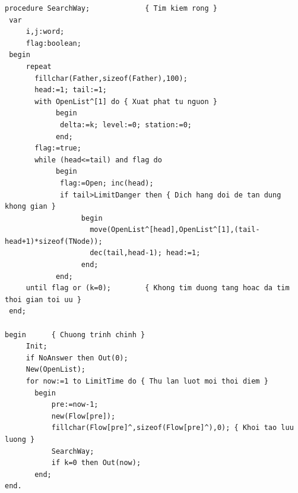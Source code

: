 \documentclass[11pt]{article}
\begin{document}
\begin{verbatim}
procedure SearchWay;             { Tim kiem rong }
 var
     i,j:word;
     flag:boolean;
 begin
     repeat
       fillchar(Father,sizeof(Father),100);
       head:=1; tail:=1;
       with OpenList^[1] do { Xuat phat tu nguon }
            begin
             delta:=k; level:=0; station:=0;
            end;
       flag:=true;
       while (head<=tail) and flag do
            begin
             flag:=Open; inc(head);
             if tail>LimitDanger then { Dich hang doi de tan dung khong gian }
                  begin
                    move(OpenList^[head],OpenList^[1],(tail-head+1)*sizeof(TNode));
                    dec(tail,head-1); head:=1;
                  end;
            end;
     until flag or (k=0);        { Khong tim duong tang hoac da tim thoi gian toi uu }
 end;

begin      { Chuong trinh chinh }
     Init;
     if NoAnswer then Out(0);
     New(OpenList);
     for now:=1 to LimitTime do { Thu lan luot moi thoi diem }
       begin
           pre:=now-1;
           new(Flow[pre]);
           fillchar(Flow[pre]^,sizeof(Flow[pre]^),0); { Khoi tao luu luong }
           SearchWay;
           if k=0 then Out(now);
       end;
end.
\end{verbatim}
\endgroup
\end{document}
